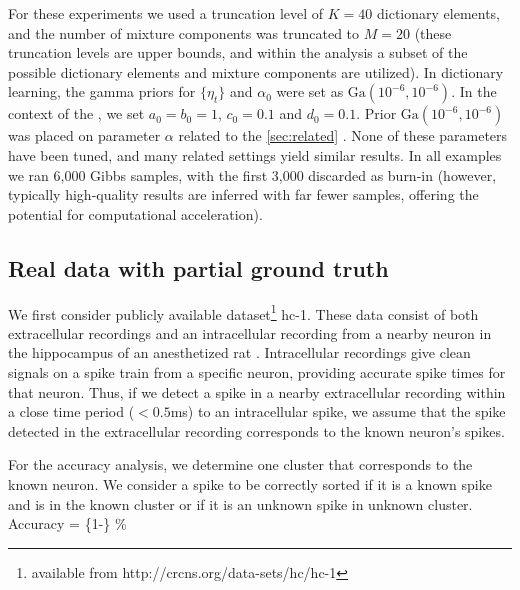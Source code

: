 \documentclass[journal]{IEEEtran}
\begin{document}
For these experiments we used a truncation level of
$K=40$ dictionary elements, and the number of mixture components was
truncated to $M=20$ (these truncation levels are upper bounds, and within the analysis a subset of the possible dictionary elements and mixture components are utilized).  In dictionary learning, the gamma priors for
$\{\eta_t\}$ and $\alpha_0$ were set as
$\mbox{Ga}(10^{-6},10^{-6})$. In the context of the , we set $a_0=b_0=1$, $c_0=0.1$ and
$d_0=0.1$. Prior $\mbox{Ga}(10^{-6},10^{-6})$ was placed on
parameter $\alpha$ related to the   \ref{sec:related} . None of these parameters have
been tuned, and many related settings yield similar results. In all
examples we ran 6,000 Gibbs samples, with the first 3,000 discarded
as burn-in (however, typically high-quality results are inferred with far fewer samples, offering the potential for computational acceleration).

\subsection{Real data with partial ground truth} 
\label{sec:truth}
We
first consider publicly available dataset\footnote{available from
http://crcns.org/data-sets/hc/hc-1} hc-1. These data consist of both
extracellular recordings and an intracellular recording from a
nearby neuron in the hippocampus of an anesthetized rat
\cite{Henze2000}.  Intracellular recordings give clean signals on a
spike train from a specific neuron, providing accurate spike times for
that neuron.  Thus, if we detect a spike in a nearby extracellular
recording within a close time period ($<0.5$ms) to an intracellular
spike, we assume that the spike detected in the extracellular
recording corresponds to the known neuron's spikes.

For the accuracy analysis, we determine one cluster that corresponds to the
known neuron.  We consider a spike to be correctly sorted if
it is a known spike and is in the known cluster or if it is an
unknown spike in  unknown cluster. 
\beq
\mbox{Accuracy} = \left\{1-\right\} \%
\eeq
{}
\end{document}
